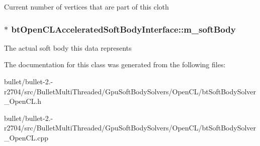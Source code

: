 Current number of vertices that are part of this cloth \hypertarget{classbt_open_c_l_accelerated_soft_body_interface_a2826fac4aa50ec2bd23660afd1f95091}{
\subsubsection[{m\+\_\+soft\+Body}]{$\ast$ bt\+Open\+C\+L\+Accelerated\+Soft\+Body\+Interface\+::m\+\_\+soft\+Body\hspace{0.3cm}{\ttfamily [protected]}}}\label{classbt_open_c_l_accelerated_soft_body_interface_a2826fac4aa50ec2bd23660afd1f95091}
The actual soft body this data represents 

The documentation for this class was generated from the following files\+:\begin{DoxyCompactItemize}
\item 
bullet/bullet-\/2.-\/r2704/src/\+Bullet\+Multi\+Threaded/\+Gpu\+Soft\+Body\+Solvers/\+Open\+C\+L/bt\+Soft\+Body\+Solver\+\_\+\+Open\+C\+L.\+h\item 
bullet/bullet-\/2.-\/r2704/src/\+Bullet\+Multi\+Threaded/\+Gpu\+Soft\+Body\+Solvers/\+Open\+C\+L/bt\+Soft\+Body\+Solver\+\_\+\+Open\+C\+L.\+cpp\end{DoxyCompactItemize}
